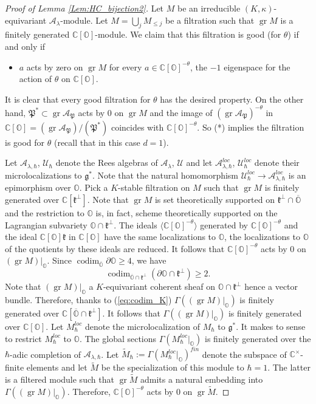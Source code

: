 \documentclass[12pt]{amsart}
\newcommand{\C}{\mathbb{C}}
\newcommand{\A}{\mathcal{A}}
\newcommand{\U}{\mathcal{U}}
\newcommand{\g}{\mathfrak{g}}
\newcommand{\Orb}{\mathbb{O}}
\newcommand{\gr}{\operatorname{gr}}
\newcommand{\kf}{\mathfrak{k}}
\newcommand{\param}{\mathfrak{P}}
\theoremstyle{definition}
\numberwithin{equation}{section}
\begin{document}
\begin{proof}[Proof of Lemma \ref{Lem:HC_bijection2}]
Let $M$ be an irreducible $(K,\kappa)$-equivariant $\A_\lambda$-module.
Let $M=\bigcup_{j}M_{\leqslant j}$ be a filtration such that $\gr M$
is a finitely generated $\C[\Orb]$-module. We claim that this filtration
is good (for $\theta$) if and only if
\begin{itemize}
\item[(*)] $a$ acts by zero on $\gr M$ for every $a\in \C[\Orb]^{-\theta}$,
the $-1$ eigenspace for the action of $\theta$ on $\C[\Orb]$.
\end{itemize}
It is clear that every good filtration for $\theta$ has the desired property.
On the other hand, $\param^*\subset \gr\A_{\param}$ acts by
$0$ on $\gr M$ and the image of $(\gr \A_{\param})^{-\theta}$
in $\C[\Orb]=(\gr \A_{\param})/(\param^*)$ coincides with
$\C[\Orb]^{-\theta}$. So (*) implies the filtration is good
for $\theta$ (recall that in this case $d=1$).

Let $\A_{\lambda,\hbar}$, $\U_\hbar$ denote the Rees algebras of $\A_{\lambda}$, $\U$
and let $\A_{\lambda,\hbar}^{loc}$, $\U_\hbar^{loc}$ denote their microlocalizations
to $\g^*$.  Note that the natural homomorphism $\U_\hbar^{loc}\rightarrow \A_{\lambda,\hbar}^{loc}$
is an epimorphism over $\Orb$. Pick a $K$-stable filtration on $M$ such that
$\gr M$ is finitely generated over $\C[\kf^\perp]$. Note that $\gr M$ is set
theoretically supported on  $\kf^\perp\cap \overline{\Orb}$ and the
restriction to $\Orb$ is, in fact, scheme theoretically supported on
the Lagrangian subvariety $\Orb\cap \kf^\perp$.
The ideals $\langle \C[\Orb]^{-\theta} \rangle$ generated by $\C[\Orb]^{-\theta}$ and the ideal $\C[\Orb]\kf$ in $\C[\Orb]$ have the same localizations
to $\Orb$, the localizations to $\Orb$ of the quotients by these ideals are reduced. It follows that $\C[\Orb]^{-\theta}$ acts by
$0$ on $(\gr M)|_{\Orb}$. Since $\operatorname{codim}_{\overline{\Orb}}\partial \Orb\geqslant 4$,
we have
\begin{equation}\label{eq:codim_K}
\operatorname{codim}_{\overline{\Orb}\cap \kf^\perp} (\partial\Orb\cap \kf^\perp)\geqslant 2.
\end{equation}
Note that $(\gr M)|_{\Orb}$ a $K$-equivariant coherent sheaf on $\Orb\cap \kf^{\perp}$ hence a vector bundle. Therefore, thanks to (\ref{eq:codim_K})
$\Gamma((\gr M)|_{\Orb})$ is finitely generated over $\C[\overline{\Orb}\cap \kf^\perp]$.
It follows that $\Gamma((\gr M)|_{\Orb})$ is finitely generated over $\C[\Orb]$.
Let $M_\hbar^{loc}$ denote the microlocalization of $M_\hbar$ to $\g^*$. It makes to sense 
to restrict $M_\hbar^{loc}$ to $\Orb$. 
The global sections $\Gamma(M_\hbar^{loc}|_{\Orb})$
is finitely generated over the $\hbar$-adic completion of $\A_{\lambda,\hbar}$.
Let $\tilde{M}_\hbar:=\Gamma(M_\hbar^{loc}|_{\Orb})^{fin}$ denote the subspace of $\C^\times$-finite
elements and let $\tilde{M}$ be the specialization of this module to $\hbar=1$.
The latter is a filtered module such that $\gr \tilde{M}$ admits a natural embedding into
$\Gamma((\gr M)|_{\Orb})$. Therefore, $\C[\Orb]^{-\theta}$ acts by $0$
on $\gr\tilde{M}$.


\end{proof}
\end{document}

